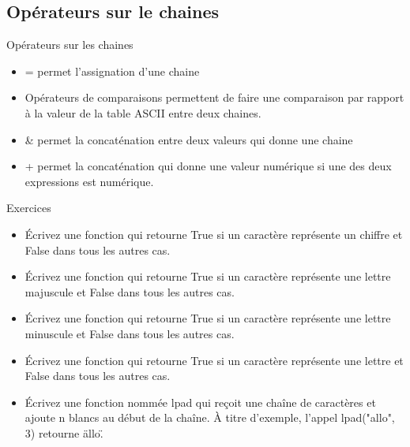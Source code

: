 \documentclass[aspectratio=169,usenames,dvipsnames]{beamer}
\begin{document}
    \subsection{Opérateurs sur le chaines}
    \begin{frame}[t]{Opérateurs sur les chaines}
        \begin{itemize}
            \item \alert{=} permet l’assignation d’une chaine
            \item Opérateurs de comparaisons permettent de faire une comparaison par rapport à la valeur de la table ASCII entre deux chaines.
            \item \alert{\&} permet la concaténation entre deux valeurs qui donne une chaine
            \item \alert{+} permet la concaténation qui donne une valeur numérique si une des deux expressions est numérique.
        \end{itemize}
    \end{frame}
    \begin{frame}{Exercices}
        \begin{itemize}
            \item Écrivez une fonction qui retourne True si un caractère représente un chiffre et False dans tous les autres cas.
            \item Écrivez une fonction qui retourne True si un caractère représente une lettre majuscule et False dans tous les autres cas.
            \item Écrivez une fonction qui retourne True si un caractère représente une lettre minuscule et False dans tous les autres cas.
            \item Écrivez une fonction qui retourne True si un caractère représente une lettre et False dans tous les autres cas.
            \item Écrivez une fonction nommée lpad qui reçoit une chaîne de caractères et ajoute n blancs au début de la chaîne.
                    À titre d'exemple, l'appel lpad("allo", 3) retourne \"   allo\".

        \end{itemize}
    \end{frame}
\end{document}
